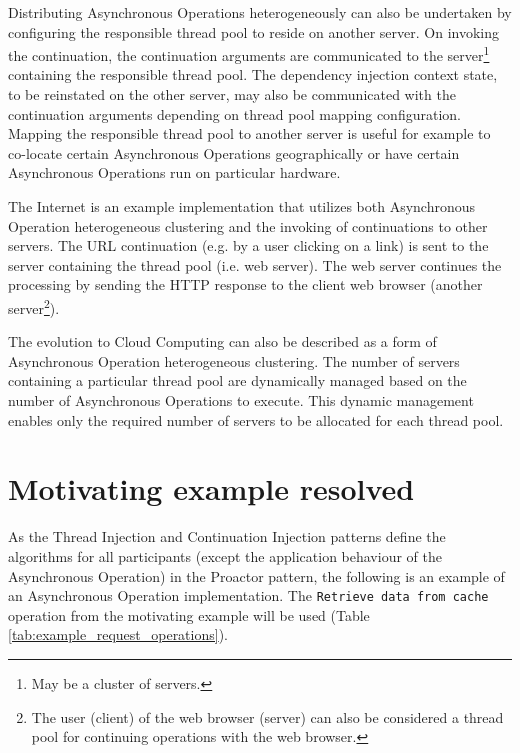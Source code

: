 \documentclass[prodmode]{style/acmlarge}
\begin{document}
Distributing Asynchronous Operations heterogeneously can also be undertaken by
configuring the responsible thread pool to reside on another server.  On
invoking the continuation, the continuation arguments are communicated to the
server\footnote{May be a cluster of servers.} containing the responsible thread
pool.  The dependency injection context state, to be reinstated on the other
server, may also be communicated with the continuation arguments depending on
thread pool mapping configuration.  Mapping the responsible thread pool to
another server is useful for example to co-locate certain Asynchronous
Operations geographically or have certain Asynchronous Operations run on
particular hardware.

The Internet is an example implementation that utilizes both Asynchronous
Operation heterogeneous clustering and the invoking of continuations to other
servers.  The URL continuation (e.g. by a user clicking on a link) is sent to
the server containing the thread pool (i.e. web server).  The web server
continues the processing by sending the HTTP response to the client web browser
(another server\footnote{The user (client) of the web browser (server) can also
be considered a thread pool for continuing operations with the web browser.}).

The evolution to Cloud Computing can also be described as a form of Asynchronous
Operation heterogeneous clustering.  The number of servers containing a
particular thread pool are dynamically managed based on the number of
Asynchronous Operations to execute.  This dynamic management enables only the
required number of servers to be allocated for each thread pool.


\section{Motivating example resolved}

As the Thread Injection and Continuation Injection patterns define the
algorithms for all participants (except the application behaviour of the
Asynchronous Operation) in the Proactor pattern, the following is an example of
an Asynchronous Operation implementation.  The \texttt{Retrieve data from cache}
operation from the motivating example will be used (Table
\ref{tab:example_request_operations}).
\end{document}
